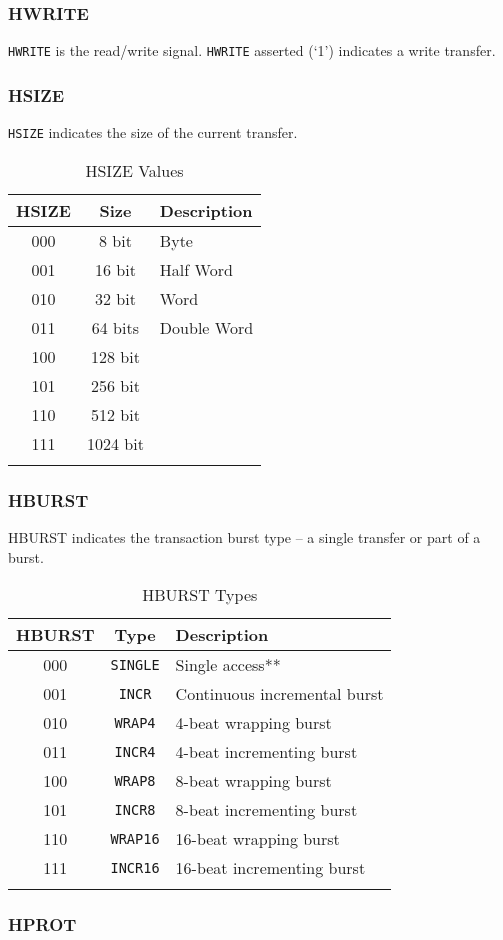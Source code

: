 \subsubsection{HWRITE}

\texttt{HWRITE} is the read/write signal. \texttt{HWRITE} asserted (`1')
indicates a write transfer.

\subsubsection{HSIZE}

\texttt{HSIZE} indicates the size of the current transfer.

\begin{longtable}[]{@{}ccl@{}}
\toprule
\textbf{HSIZE} & \textbf{Size} & \textbf{Description}\tabularnewline
\midrule
\endhead
000 & 8 bit & Byte\tabularnewline
001 & 16 bit & Half Word\tabularnewline
010 & 32 bit & Word\tabularnewline
011 & 64 bits & Double Word\tabularnewline
100 & 128 bit &\tabularnewline
101 & 256 bit &\tabularnewline
110 & 512 bit &\tabularnewline
111 & 1024 bit &\tabularnewline
\bottomrule
\caption{HSIZE Values}
\label{tab:HSIZE}
\end{longtable}

\subsubsection{HBURST}

HBURST indicates the transaction burst type -- a single transfer or part
of a burst.

\begin{longtable}[]{@{}ccl@{}}
\toprule
\textbf{HBURST} & \textbf{Type} & \textbf{Description}\tabularnewline
\midrule
\endhead
000 & \texttt{SINGLE} & Single access**\tabularnewline
001 & \texttt{INCR} & Continuous incremental burst\tabularnewline
010 & \texttt{WRAP4} & 4-beat wrapping burst\tabularnewline
011 & \texttt{INCR4} & 4-beat incrementing burst\tabularnewline
100 & \texttt{WRAP8} & 8-beat wrapping burst\tabularnewline
101 & \texttt{INCR8} & 8-beat incrementing burst\tabularnewline
110 & \texttt{WRAP16} & 16-beat wrapping burst\tabularnewline
111 & \texttt{INCR16} & 16-beat incrementing burst\tabularnewline
\bottomrule
\caption{HBURST Types}
\label{tab:HBURST}
\end{longtable}

\subsubsection{HPROT}

